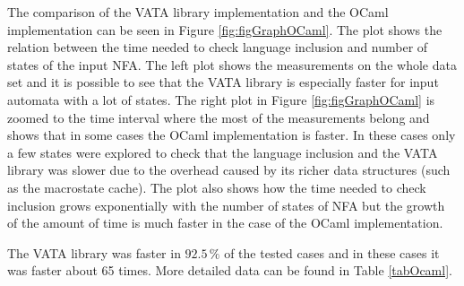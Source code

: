 The comparison of the VATA library implementation and the OCaml implementation can be seen in Figure \ref{fig:figGraphOCaml}. 
The plot shows the relation between the time needed to check language inclusion and number of states of the input NFA.
The left plot shows the measurements on the whole data set and it is possible to see that the VATA library is especially faster for input automata with a lot
of states. The right plot in Figure \ref{fig:figGraphOCaml} is zoomed to the time interval where the most of the measurements belong and 
shows that in some cases the OCaml implementation is faster. In these cases only a few states were explored to 
check that the language inclusion and the VATA library was slower due to the overhead caused by its richer data structures 
(such as the macrostate cache). The plot also shows how the time needed to check inclusion grows exponentially with the number of states of NFA but 
the growth of the amount of time is much faster in the case of the OCaml implementation.

The VATA library was faster in $92.5\,\%$ of the tested cases and in these cases it was faster about 65 times. More detailed data can be found 
in Table \ref{tabOcaml}.

